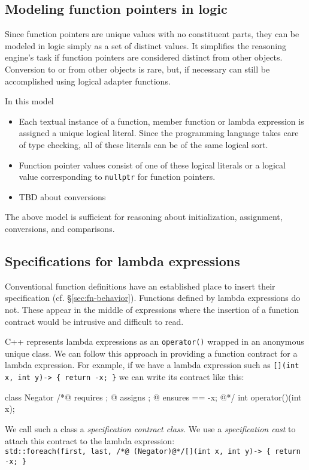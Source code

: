\subsection{Modeling function pointers in logic}
\label{sec:modelingfp}
 
 Since function pointers are unique values with no constituent parts, they can be modeled in logic simply as a set of distinct values. It simplifies the reasoning engine's task if
 function pointers are considered distinct from other objects.
 Conversion to or from other objects is rare, but, if necessary can still be accomplished using logical adapter functions.
 
 In this model
 \begin{itemize}
 	\item Each textual instance of a function, member function or lambda expression is assigned a unique logical literal.
 	Since the programming language takes care of type checking,
 	all of these literals can be of the same logical sort.
 	\item Function pointer values consist of one of these logical literals or a logical value corresponding to 
 	\lstinline|nullptr| for function pointers.
 	\item TBD about conversions
 \end{itemize}
The above model is sufficient for reasoning about initialization, assignment, conversions, and comparisons.

\subsection{Specifications for lambda expressions}
\label{sec:lambdaspecs}

Conventional function definitions have an established place to insert their specification (cf. \S\ref{sec:fn-behavior}). Functions defined by lambda expressions do not. These appear in the middle of expressions where the insertion of a function contract would be intrusive and difficult to read.

C++ represents lambda expressions as an \lstinline|operator()| wrapped in an anonymous unique class. We can follow this 
approach in providing a function contract for a lambda expression.  
For example, if we have a lambda expression such as \lstinline|[](int x, int y)-> { return -x; }| we can write its contract like this:
\begin{listing-nonumber}
	class Negator {
		/*@ requires \true;
		  @ assigns \nothing;
		  @ ensures \result == -x;
		  @*/
		int operator()(int x);
	}
\end{listing-nonumber}
We call such a class a \emph{specification contract class}.
We use a \emph{specification cast} to attach this contract to
the lambda expression:\\
\lstinline|std::foreach(first, last, /*@ (Negator)@*/[](int x, int y)-> { return -x; }|


